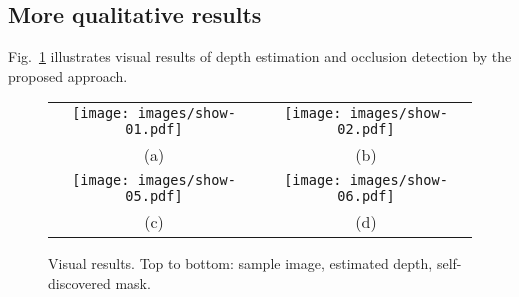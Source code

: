 \documentclass{article}
\newcommand{\figref}[1]{Fig.~\ref{#1}}
\begin{document}
\subsection{More qualitative results}

\figref{fig-show2} illustrates visual results of depth estimation and occlusion detection by the proposed approach.

\begin{figure}[!h]
\centering
\begin{tabular}{cc}
\texttt{[image: images/show-01.pdf]}& 
\texttt{[image: images/show-02.pdf]}\\
(a) & (b) \\
\texttt{[image: images/show-05.pdf]}& 
\texttt{[image: images/show-06.pdf]}\\
(c) & (d)
\end{tabular}
\caption{Visual results. Top to bottom: sample image, estimated depth, self-discovered mask.}
\label{fig-show2}
\vspace{-2mm}
\end{figure}
\end{document}

